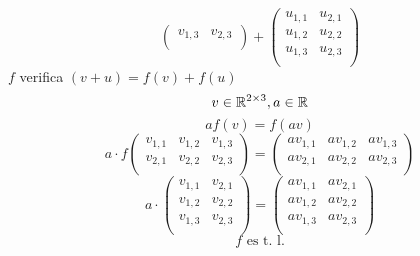 \documentclass[../practica.root.tex]{subfiles}
\begin{document}
\begin{enumerate}
\begin{enumerate}
\[\begin{pmatrix}
                            v_{1,3} & v_{2,3} \\
                        \end{pmatrix}
                        +
                        \begin{pmatrix}
                            u_{1,1} & u_{2,1} \\
                            u_{1,2} & u_{2,2} \\
                            u_{1,3} & u_{2,3} \\
                        \end{pmatrix}
                    \]
                    $f$ verifica $(v + u) = f(v) + f(u)$
                    \[ v \in \mathbb{R}^{2\times3}, a \in \mathbb{R} \]
                    \[ af(v) = f(av) \]
                    \[
                        a\cdot f
                        \begin{pmatrix}
                            v_{1,1} & v_{1,2} & v_{1,3} \\
                            v_{2,1} & v_{2,2} & v_{2,3} \\
                        \end{pmatrix}
                        =
                        \begin{pmatrix}
                            av_{1,1} & av_{1,2} & av_{1,3} \\
                            av_{2,1} & av_{2,2} & av_{2,3} \\
                        \end{pmatrix}
                    \] \[
                        a\cdot
                        \begin{pmatrix}
                            v_{1,1} & v_{2,1} \\
                            v_{1,2} & v_{2,2} \\
                            v_{1,3} & v_{2,3} \\
                        \end{pmatrix}
                        =
                        \begin{pmatrix}
                            av_{1,1} & av_{2,1} \\
                            av_{1,2} & av_{2,2} \\
                            av_{1,3} & av_{2,3} \\
                        \end{pmatrix}
                    \]
                    \[ \boxed{f \text{ es t. l.}} \]

\end{enumerate}
\end{enumerate}
\end{document}
